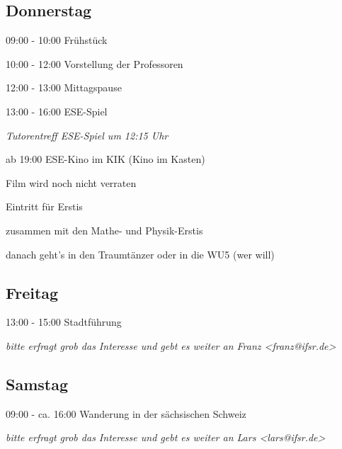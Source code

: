 \documentclass[a4paper,12pt]{report}
\begin{document}
\subsection{Donnerstag}
\begin{itemize*}
\item 09:00 - 10:00 Frühstück
\item 10:00 - 12:00 Vorstellung der Professoren
\item 12:00 - 13:00 Mittagspause
\item 13:00 - 16:00 ESE-Spiel
\begin{itemize*}
  \item \small{\textit{Tutorentreff ESE-Spiel um 12:15 Uhr}}
\end{itemize*}
\item ab 19:00 ESE-Kino im KIK (Kino im Kasten)
\begin{itemize*}
	\item Film wird noch nicht verraten
	\item Eintritt für Erstis 
	\item zusammen mit den Mathe- und Physik-Erstis
	\item danach geht's in den Traumtänzer oder in die WU5 (wer will)
\end{itemize*}
\end{itemize*}

\subsection{Freitag}
\begin{itemize*}
\item 13:00 - 15:00 Stadtführung
\begin{itemize*}
  \item \small{\textit{bitte erfragt grob das Interesse und gebt es weiter an Franz <franz@ifsr.de>}}
\end{itemize*}
\end{itemize*}

\subsection{Samstag}
\begin{itemize*}
\item 09:00 - ca. 16:00 Wanderung in der sächsischen Schweiz
\begin{itemize*}
  \item \small{\textit{bitte erfragt grob das Interesse und gebt es weiter an Lars <lars@ifsr.de>}}
\end{itemize*}
\end{itemize*}
\end{document}
